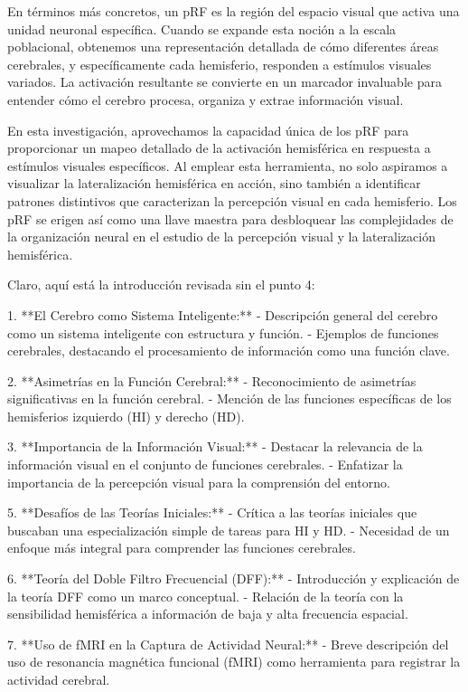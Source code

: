 \documentclass[12pt,oneside]{uhthesis}
\begin{document}
En términos más concretos, un pRF es la región del espacio visual que activa una unidad neuronal específica. Cuando se expande esta noción a la escala poblacional, obtenemos una representación detallada de cómo diferentes áreas cerebrales, y específicamente cada hemisferio, responden a estímulos visuales variados. La activación resultante se convierte en un marcador invaluable para entender cómo el cerebro procesa, organiza y extrae información visual.

En esta investigación, aprovechamos la capacidad única de los pRF para proporcionar un mapeo detallado de la activación hemisférica en respuesta a estímulos visuales específicos. Al emplear esta herramienta, no solo aspiramos a visualizar la lateralización hemisférica en acción, sino también a identificar patrones distintivos que caracterizan la percepción visual en cada hemisferio. Los pRF se erigen así como una llave maestra para desbloquear las complejidades de la organización neural en el estudio de la percepción visual y la lateralización hemisférica.
\newpage

Claro, aquí está la introducción revisada sin el punto 4:

1. **El Cerebro como Sistema Inteligente:**
- Descripción general del cerebro como un sistema inteligente con estructura y función.
- Ejemplos de funciones cerebrales, destacando el procesamiento de información como una función clave.

2. **Asimetrías en la Función Cerebral:**
- Reconocimiento de asimetrías significativas en la función cerebral.
- Mención de las funciones específicas de los hemisferios izquierdo (HI) y derecho (HD).

3. **Importancia de la Información Visual:**
- Destacar la relevancia de la información visual en el conjunto de funciones cerebrales.
- Enfatizar la importancia de la percepción visual para la comprensión del entorno.

5. **Desafíos de las Teorías Iniciales:**
- Crítica a las teorías iniciales que buscaban una especialización simple de tareas para HI y HD.
- Necesidad de un enfoque más integral para comprender las funciones cerebrales.

6. **Teoría del Doble Filtro Frecuencial (DFF):**
- Introducción y explicación de la teoría DFF como un marco conceptual.
- Relación de la teoría con la sensibilidad hemisférica a información de baja y alta frecuencia espacial.

7. **Uso de fMRI en la Captura de Actividad Neural:**
- Breve descripción del uso de resonancia magnética funcional (fMRI) como herramienta para registrar la actividad cerebral.
\end{document}
